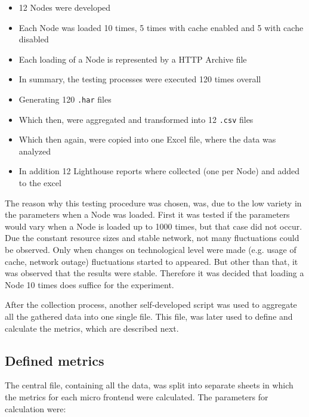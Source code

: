 \begin{itemize}[noitemsep]
	\item 12 Nodes were developed
	\item Each Node was loaded 10 times, 5 times with cache enabled and 5 with cache disabled
	\item Each loading of a Node is represented by a HTTP Archive file
	\item In summary, the testing processes were executed 120 times overall
	\item Generating 120 \texttt{.har} files
	\item Which then, were aggregated and transformed into 12 \texttt{.csv} files
	\item Which then again, were copied into one Excel file, where the data was analyzed
	\item In addition 12 Lighthouse reports where collected (one per Node) and added to the excel
\end{itemize}

The reason why this testing procedure was chosen, was, due to the low variety in the parameters when a Node was loaded. First it was tested if the parameters would vary when a Node is loaded up to 1000 times, but that case did not occur. Due the constant resource sizes and stable network, not many fluctuations could be observed. Only when changes on technological level were made (e.g. usage of cache, network outage) fluctuations started to appeared. But other than that, it was observed that the results were stable. Therefore it was decided that loading a Node 10 times does suffice for the experiment.

After the collection process, another self-developed script was used to aggregate all the gathered data into one single file. This file, was later used to define and calculate the metrics, which are described next.

\subsection{Defined metrics}

The central file, containing all the data, was split into separate sheets in which the metrics for each micro frontend were calculated. The parameters for calculation were:

